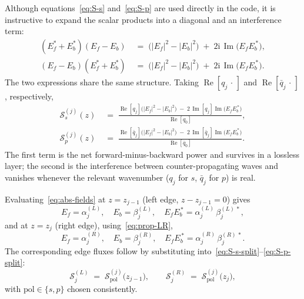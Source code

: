 \documentclass[aps,prb,onecolumn,superscriptaddress,nofootinbib,11pt]{revtex4-2}
\newcommand{\ii}{\mathrm{i}}
\DeclareMathOperator{\Rey}{Re}
\DeclareMathOperator{\Imy}{Im}
\begin{document}
Although equations~\eqref{eq:S-s} and~\eqref{eq:S-p} are used directly in the code, it is instructive to expand the scalar products into a diagonal and an interference term:
\begin{align}
  (E_f^* + E_b^*)(E_f - E_b)
  &\;=\; \bigl(|E_f|^2 - |E_b|^2\bigr)
  \;+\; 2\ii\, \Imy\!\bigl(E_f E_b^{\,*}\bigr),
  \label{eq:split-s}\\[2pt]
  (E_f - E_b)(E_f^* + E_b^*)
  &\;=\; \bigl(|E_f|^2 - |E_b|^2\bigr)
  \;+\; 2\ii\, \Imy\!\bigl(E_f E_b^{\,*}\bigr).
  \label{eq:split-p}
\end{align}
The two expressions share the same structure. Taking $\Rey[q_j\,\cdot\,]$ and $\Rey[\bar{q}_j\,\cdot\,]$, respectively,
\begin{align}
  \mathcal{S}_s^{(j)}(z)
  &\;=\; \frac{
    \Rey[q_j]\bigl(|E_f|^2 - |E_b|^2\bigr)
    \;-\; 2\,\Imy[q_j]\Imy\!\bigl(E_f E_b^{\,*}\bigr)
  }{\Rey[q_0]},
  \label{eq:S-s-split}\\[2pt]
  \mathcal{S}_p^{(j)}(z)
  &\;=\; \frac{
    \Rey[\bar q_j]\bigl(|E_f|^2 - |E_b|^2\bigr)
    \;-\; 2\,\Imy[\bar q_j]\Imy\!\bigl(E_f E_b^{\,*}\bigr)
  }{\Rey[\bar q_0]}.
  \label{eq:S-p-split}
\end{align}
The first term is the net forward-minus-backward power and survives in a lossless layer; the second is the interference between counter-propagating waves and vanishes whenever the relevant wavenumber ($q_j$ for $s$, $\bar{q}_j$ for $p$) is real.

Evaluating~\eqref{eq:abs-fields} at $z = z_{j-1}$ (left edge, $z - z_{j-1} = 0$) gives
\begin{equation}
  E_f = \alpha_j^{(L)}, \quad
  E_b = \beta_j^{(L)}, \quad
  E_f E_b^{\,*} = \alpha_j^{(L)}\,\beta_j^{(L)\,*},
  \label{eq:edge-L}
\end{equation}
and at $z = z_j$ (right edge), using~\eqref{eq:prop-LR},
\begin{equation}
  E_f = \alpha_j^{(R)}, \quad
  E_b = \beta_j^{(R)}, \quad
  E_f E_b^{\,*} = \alpha_j^{(R)}\,\beta_j^{(R)\,*}.
  \label{eq:edge-R}
\end{equation}
The corresponding edge fluxes follow by substituting into~\eqref{eq:S-s-split}--\eqref{eq:S-p-split}:
\begin{equation}
  \mathcal{S}^{(L)}_j
  \;=\; \mathcal{S}_{\text{pol}}^{(j)}\bigl(z_{j-1}\bigr),
  \qquad
  \mathcal{S}^{(R)}_j
  \;=\; \mathcal{S}_{\text{pol}}^{(j)}\bigl(z_{j}\bigr),
  \label{eq:edge-fluxes}
\end{equation}
with $\text{pol} \in \{s, p\}$ chosen consistently.
\end{document}
